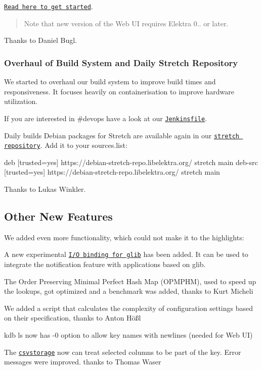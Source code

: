 \href{https://www.libelektra.org/tools/web}{\tt Read here to get started}.

\begin{quote}
Note that new version of the Web UI requires Elektra 0.. or later. \end{quote}


Thanks to Daniel Bugl.

\subsubsection*{Overhaul of Build System and Daily Stretch Repository}

We started to overhaul our build system to improve build times and responsiveness. It focuses heavily on containerisation to improve hardware utilization.

If you are interested in {\ttfamily \#devops} have a look at our \href{https://github.com/ElektraInitiative/libelektra/blob/master/scripts/jenkins/Jenkinsfile}{\tt Jenkinsfile}.

Daily builds Debian packages for Stretch are available again in our \href{https://debian-stretch-repo.libelektra.org}{\tt stretch repository}. Add it to your {\ttfamily sources.\+list}\+:


\begin{DoxyCode}
deb     [trusted=yes] https://debian-stretch-repo.libelektra.org/ stretch main
deb-src [trusted=yes] https://debian-stretch-repo.libelektra.org/ stretch main
\end{DoxyCode}


Thanks to Lukas Winkler.

\subsection*{Other New Features}

We added even more functionality, which could not make it to the highlights\+:


\begin{DoxyItemize}
\item A new experimental \href{https://www.libelektra.org/bindings/io_glib}{\tt I/O binding for glib} has been added. It can be used to integrate the notification feature with applications based on glib.
\item The Order Preserving Minimal Perfect Hash Map (O\+P\+M\+P\+HM), used to speed up the lookups, got optimized and a benchmark was added, thanks to Kurt Micheli
\item We added a script that calculates the complexity of configuration settings based on their specification, thanks to Anton Hößl
\item {\ttfamily kdb ls} now has {\ttfamily -\/0} option to allow key names with newlines (needed for Web UI)
\item The \href{https://www.libelektra.org/plugins/csvstorage}{\tt csvstorage} now can treat selected columns to be part of the key. Error messages were improved. thanks to Thomas Waser
\end{DoxyItemize}

